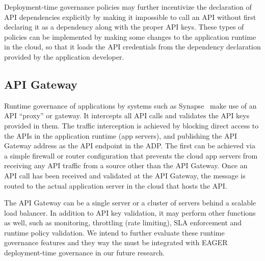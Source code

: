 Deployment-time governance policies
may further incentivize the declaration of API 
dependencies explicitly by making it 
impossible to call an API without first declaring it as a dependency along
with the proper API keys. These types of policies can be implemented
by making some changes to the
application runtime in the cloud, so that it loads the API credentials from
the dependency declaration provided by the application developer.

\subsection{API Gateway} 
Runtime governance of applications by systems such as
Synapse~\cite{XXXSynapseXXX} make use of an API ``proxy'' or gateway.
It
intercepts all API calls and validates the API keys provided in them. The
traffic interception is achieved by blocking direct access to the APIs in the
application runtime (app servers), and publishing the API Gateway address as
the API endpoint in the ADP. The first can be achieved via a simple firewall
or router configuration that prevents the cloud app servers from receiving any
API traffic from a source other than the API Gateway. Once an API call has
been received and validated at the API Gateway, the message is routed to the
actual application server in the cloud that hosts the API.

The API Gateway can be a single server or a cluster of servers 
behind a scalable load balancer. %
In addition to API key validation, it may perform other
functions as well, such as monitoring, throttling (rate limiting), SLA
enforcement and runtime policy validation. We intend to further evaluate these
runtime governance features and they way the must be integrated with
EAGER deployment-time governance
in our future research.
